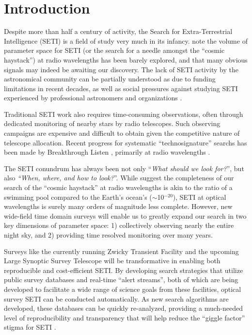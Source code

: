 \documentclass[twocolumn]{aastex62}
\begin{document}


\section{Introduction}

Despite more than half a century of activity, the Search for Extra-Terrestrial Intelligence (SETI) is a field of study very much in its infancy. 
\citet{wright2018c} note the volume of parameter space for SETI (or the search for a needle amongst the ``cosmic haystack'') at radio wavelengths has been barely explored, and that many obvious signals may indeed be awaiting our discovery. 
The lack of SETI activity by the astronomical community can be partially understood as due to funding limitations in recent decades, as well as social pressures against studying SETI experienced by professional astronomers and organizations \citep{wright2018b}. 


Traditional SETI work also requires time-consuming observations, often through dedicated monitoring of nearby stars by radio telescopes. Such observing campaigns are expensive and difficult to obtain given the competitive nature of telescope allocation. Recent progress for systematic ``technosignature'' searchs has been made by Breakthrough Listen \citep{worden2017,isaacson2017}, primarily at radio wavelengths \citep[e.g.][]{price2018}. 


The SETI conundrum has always been not only ``{\it What should we look for?}'', but  also {\it ``When, where, and how to look?}''. 
While \citet{wright2018c} suggest the completeness of our search of the ``cosmic haystack'' at radio wavelengths is akin to the ratio of a swimming pool compared to the Earth's ocean's ($\sim$10$^{-20}$), SETI at optical wavelengths is surely many orders of magnitude less complete. However, new wide-field time domain surveys will enable us to greatly expand our search in two key dimensions of parameter space: 1) collectively observing nearly the entire night sky, and 2) providing time resolved monitoring over many years. 


Surveys like the currently running Zwicky Transient Facility \citep[ZTF][]{bellm2014} and the upcoming Large Synoptic Survey Telescope \citep[LSST][]{lsst} will be transformative in enabling both reproducible and cost-efficient SETI. By developing search strategies that utilize public survey databases and real-time ``alert streams'', both of which are being developed to facilitate a wide range of science goals from these facilities, optical survey SETI can be conducted automatically. As new search algorithms are developed, these databases can be quickly re-analyzed, providing a much-needed level of reproducibility and transparency that will help reduce the ``giggle factor'' stigma for SETI \citep{wright2018b}.
\end{document}
